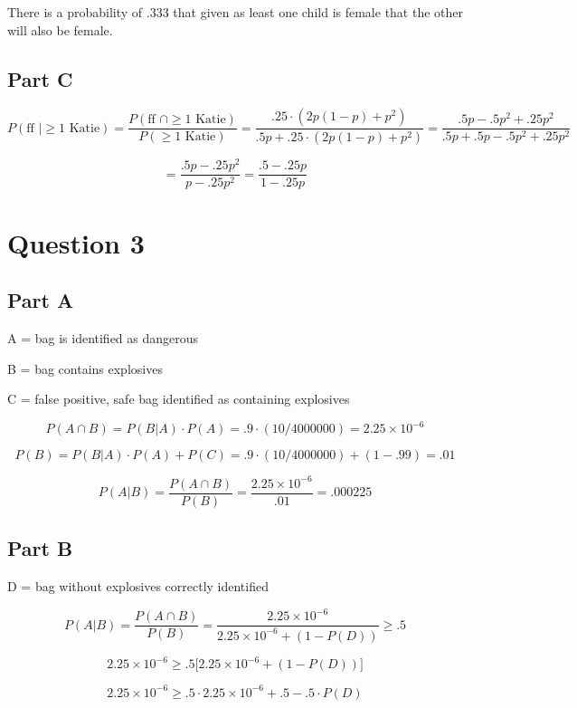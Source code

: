 \documentclass[letterpaper]{article}
\begin{document}
\noindent There is a probability of .333 that given as least one child is female that the other will also be female.

\subsection*{Part C}

$$P(\text{ff } | \geq \text{1 Katie}) = \frac{P(\text{ff } \cap \geq \text{1 Katie})}{P(\geq  \text{1 Katie})} = \frac{.25 \cdot (2p(1-p) + p^2)}{.5p + .25 \cdot (2p(1-p) + p^2)} = \frac{.5p - .5p^2 + .25p^2}{.5p + .5p - .5p^2 + .25p^2}$$

$$= \frac{.5p - .25p^2}{p - .25p^2} = \frac{.5 - .25p}{1 - .25p}$$

\newpage

\section*{Question 3}

\subsection*{Part A}

A = {bag is identified as dangerous}

\noindent B = {bag contains explosives}

\noindent C = {false positive, safe bag identified as containing explosives}

$$P(A \cap B) = P(B|A) \cdot P(A) = .9 \cdot (10/4000000) = 2.25 \times 10^{-6}$$

$$P(B) = P(B|A) \cdot P(A) + P(C) = .9 \cdot (10/4000000) + (1 - .99) = .01$$

$$P(A|B) = \frac{P(A \cap B)}{P(B)} = \frac{2.25 \times 10^{-6}}{.01} = .000225$$

\subsection*{Part B}

D = {bag without explosives correctly identified}

$$P(A|B) = \frac{P(A \cap B)}{P(B)} = \frac{2.25 \times 10^{-6}}{2.25 \times 10^{-6} + (1 - P(D))} \geq .5$$

$$2.25 \times 10^{-6} \geq .5 \big[ 2.25 \times 10^{-6} + (1 - P(D)) \big]$$

$$2.25 \times 10^{-6} \geq .5 \cdot 2.25 \times 10^{-6} + .5 - .5 \cdot P(D)$$
\end{document}
